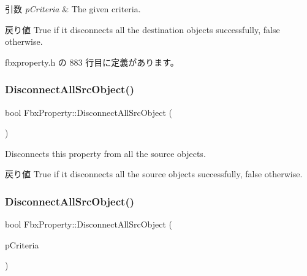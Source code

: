 \begin{DoxyParams}{引数}
{\em p\+Criteria} & The given criteria. \\
\hline
\end{DoxyParams}
\begin{DoxyReturn}{戻り値}
{\ttfamily True} if it disconnects all the destination objects successfully, {\ttfamily false} otherwise. 
\end{DoxyReturn}


 fbxproperty.\+h の 883 行目に定義があります。

\mbox{\label{class_fbx_property_a7b9a767f964e705be7436739c5752644}} 
\subsubsection{\texorpdfstring{Disconnect\+All\+Src\+Object()}{DisconnectAllSrcObject()}\hspace{0.1cm}{\footnotesize\ttfamily [1/4]}}
{\footnotesize\ttfamily bool Fbx\+Property\+::\+Disconnect\+All\+Src\+Object (\begin{DoxyParamCaption}{ }\end{DoxyParamCaption})}

Disconnects this property from all the source objects. \begin{DoxyReturn}{戻り値}
{\ttfamily True} if it disconnects all the source objects successfully, {\ttfamily false} otherwise. 
\end{DoxyReturn}
\mbox{\label{class_fbx_property_a5535e9be6a48d8fd8fcb3a382067be8d}} 
\subsubsection{\texorpdfstring{Disconnect\+All\+Src\+Object()}{DisconnectAllSrcObject()}\hspace{0.1cm}{\footnotesize\ttfamily [2/4]}}
{\footnotesize\ttfamily bool Fbx\+Property\+::\+Disconnect\+All\+Src\+Object (\begin{DoxyParamCaption}\item[{const \hyperlink{class_fbx_criteria}{Fbx\+Criteria} \&}]{p\+Criteria }\end{DoxyParamCaption})}

